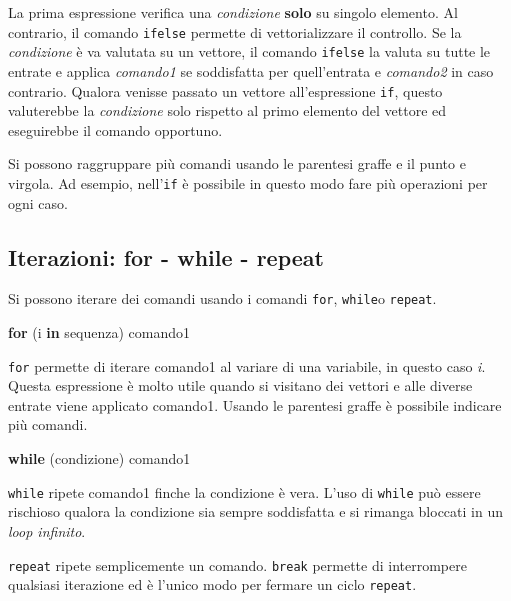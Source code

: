 \documentclass[]{book}
\newenvironment{Shaded}{\begin{snugshade}}{\end{snugshade}}
\newcommand{\ControlFlowTok}[1]{\textcolor[rgb]{0.13,0.29,0.53}{\textbf{#1}}}
\newcommand{\NormalTok}[1]{#1}
\begin{document}
La prima espressione verifica una \emph{condizione} \textbf{solo} su singolo elemento. Al contrario, il comando \texttt{ifelse} permette di vettorializzare il controllo. Se la \emph{condizione} è va valutata su un vettore, il comando \texttt{ifelse} la valuta su tutte le entrate e applica \emph{comando1} se soddisfatta per quell'entrata e \emph{comando2} in caso contrario. Qualora venisse passato un vettore all'espressione \texttt{if}, questo valuterebbe la \emph{condizione} solo rispetto al primo elemento del vettore ed eseguirebbe il comando opportuno.

Si possono raggruppare più comandi usando le parentesi graffe e il punto e virgola. Ad esempio, nell'\texttt{if} è possibile in questo modo fare più operazioni per ogni caso.

\hypertarget{iterazioni-for---while---repeat}{%
\subsection{Iterazioni: for - while - repeat}\label{iterazioni-for---while---repeat}}

Si possono iterare dei comandi usando i comandi \texttt{for}, \texttt{while}o \texttt{repeat}.

\begin{Shaded}
\begin{Highlighting}[]
\ControlFlowTok{for}\NormalTok{ (i }\ControlFlowTok{in}\NormalTok{ sequenza) comando1}
\end{Highlighting}
\end{Shaded}

\texttt{for} permette di iterare comando1 al variare di una variabile, in questo caso \emph{i}. Questa espressione è molto utile quando si visitano dei vettori e alle diverse entrate viene applicato comando1. Usando le parentesi graffe è possibile indicare più comandi.

\begin{Shaded}
\begin{Highlighting}[]
\ControlFlowTok{while}\NormalTok{ (condizione) comando1}
\end{Highlighting}
\end{Shaded}

\texttt{while} ripete comando1 finche la condizione è vera. L'uso di \texttt{while} può essere rischioso qualora la condizione sia sempre soddisfatta e si rimanga bloccati in un \emph{loop infinito}.

\texttt{repeat} ripete semplicemente un comando. \texttt{break} permette di interrompere qualsiasi iterazione ed è l'unico modo per fermare un ciclo \texttt{repeat}.
\end{document}
